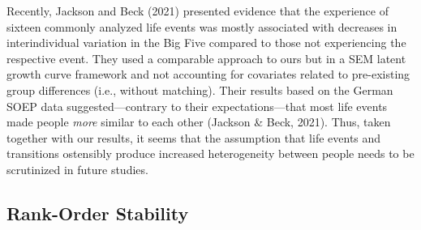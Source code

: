 \documentclass[
  english,
  man,floatsintext]{apa7}
\begin{document}
Recently, Jackson and Beck (2021) presented evidence that the experience of sixteen commonly analyzed life events was mostly associated with decreases in interindividual variation in the Big Five compared to those not experiencing the respective event. They used a comparable approach to ours but in a SEM latent growth curve framework and not accounting for covariates related to pre-existing group differences (i.e., without matching). Their results based on the German SOEP data suggested---contrary to their expectations---that most life events made people \emph{more} similar to each other (Jackson \& Beck, 2021). Thus, taken together with our results, it seems that the assumption that life events and transitions ostensibly produce increased heterogeneity between people needs to be scrutinized in future studies.

\hypertarget{rank-order-stability-1}{%
\subsection{Rank-Order Stability}\label{rank-order-stability-1}}
\end{document}
